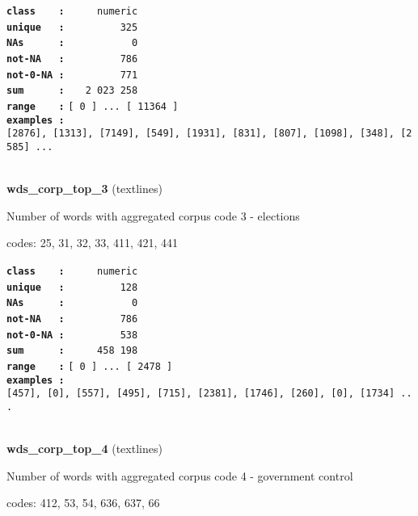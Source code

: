 \documentclass[]{article}
\begin{document}
\textbf{\texttt{class\ \ \ \ :}} \texttt{~~~~~numeric}\\
\textbf{\texttt{unique\ \ \ :}} \texttt{~~~~~~~~~325}\\
\textbf{\texttt{NAs\ \ \ \ \ \ :}} \texttt{~~~~~~~~~~~0}\\
\textbf{\texttt{not-NA\ \ \ :}} \texttt{~~~~~~~~~786}\\
\textbf{\texttt{not-0-NA\ :}} \texttt{~~~~~~~~~771}\\
\textbf{\texttt{sum\ \ \ \ \ \ :}} \texttt{~~~2~023~258}\\
\textbf{\texttt{range\ \ \ \ :}}
\texttt{{[}\ 0\ {]}\ ...\ {[}\ 11364\ {]}}\\
\textbf{\texttt{examples\ :}}
\texttt{{[}2876{]},\ {[}1313{]},\ {[}7149{]},\ {[}549{]},\ {[}1931{]},\ {[}831{]},\ {[}807{]},\ {[}1098{]},\ {[}348{]},\ {[}2585{]}\ ...}\\

~

\textbf{wds\_corp\_top\_3} (textlines)

Number of words with aggregated corpus code 3 - elections

codes: 25, 31, 32, 33, 411, 421, 441

\textbf{\texttt{class\ \ \ \ :}} \texttt{~~~~~numeric}\\
\textbf{\texttt{unique\ \ \ :}} \texttt{~~~~~~~~~128}\\
\textbf{\texttt{NAs\ \ \ \ \ \ :}} \texttt{~~~~~~~~~~~0}\\
\textbf{\texttt{not-NA\ \ \ :}} \texttt{~~~~~~~~~786}\\
\textbf{\texttt{not-0-NA\ :}} \texttt{~~~~~~~~~538}\\
\textbf{\texttt{sum\ \ \ \ \ \ :}} \texttt{~~~~~458~198}\\
\textbf{\texttt{range\ \ \ \ :}}
\texttt{{[}\ 0\ {]}\ ...\ {[}\ 2478\ {]}}\\
\textbf{\texttt{examples\ :}}
\texttt{{[}457{]},\ {[}0{]},\ {[}557{]},\ {[}495{]},\ {[}715{]},\ {[}2381{]},\ {[}1746{]},\ {[}260{]},\ {[}0{]},\ {[}1734{]}\ ...}\\

~

\textbf{wds\_corp\_top\_4} (textlines)

Number of words with aggregated corpus code 4 - government control

codes: 412, 53, 54, 636, 637, 66
\end{document}
